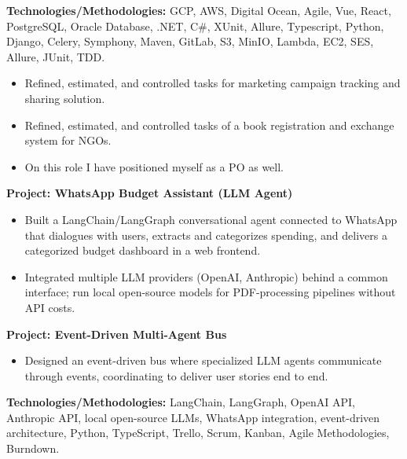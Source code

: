 \documentclass[10pt,a4paper]{altacv}
\begin{document}
\textbf{Technologies/Methodologies:} GCP, AWS, Digital Ocean, Agile, Vue, React, PostgreSQL, Oracle Database, .NET, C\#, XUnit, Allure, Typescript, Python, Django, Celery, Symphony, Maven, GitLab, S3, MinIO, Lambda, EC2, SES, Allure, JUnit, TDD.
\vspace{5mm}

\begin{itemize}
    \setlength{\itemindent}{0.5em}
    \item[--] Refined, estimated, and controlled tasks for marketing campaign tracking and sharing solution.
    \item[--] Refined, estimated, and controlled tasks of a book registration and exchange system for NGOs.
    \item[--] On this role I have positioned myself as a PO as well.
\end{itemize}

\textbf{Project: WhatsApp Budget Assistant (LLM Agent)}
\begin{itemize}
    \setlength{\itemindent}{0.5em}
    \item[--] Built a LangChain/LangGraph conversational agent connected to WhatsApp that dialogues with users, extracts and categorizes spending, and delivers a categorized budget dashboard in a web frontend.
    \item[--] Integrated multiple LLM providers (OpenAI, Anthropic) behind a common interface; run local open-source models for PDF-processing pipelines without API costs.
\end{itemize}

\textbf{Project: Event-Driven Multi-Agent Bus}
\begin{itemize}
    \setlength{\itemindent}{0.5em}
    \item[--] Designed an event-driven bus where specialized LLM agents communicate through events, coordinating to deliver user stories end to end.
\end{itemize}

\textbf{Technologies/Methodologies:} LangChain, LangGraph, OpenAI API, Anthropic API, local open-source LLMs, WhatsApp integration, event-driven architecture, Python, TypeScript, Trello, Scrum, Kanban, Agile Methodologies, Burndown.
\vspace{5mm}

\break
\newpage
{}
\end{document}
